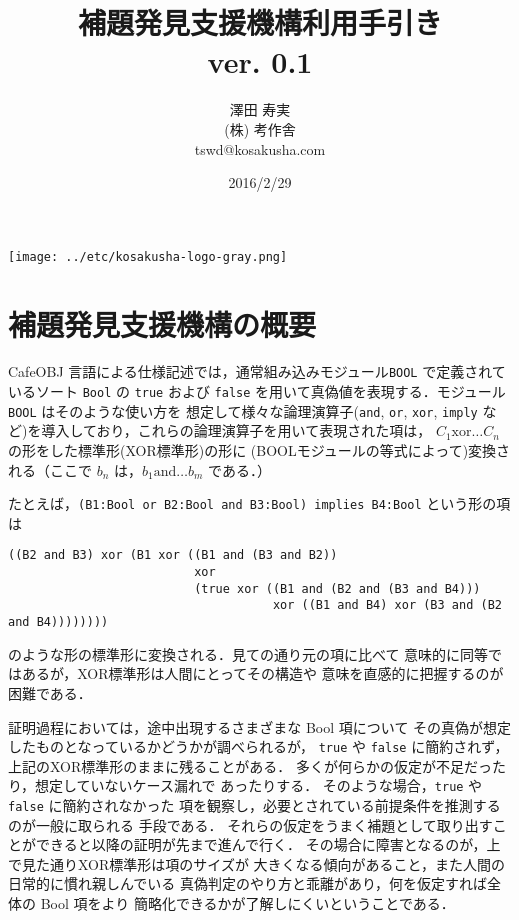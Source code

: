 \documentclass[a4paper,oneside,10pt,here]{memoir}
\begin{document}
\tightlists
\sloppy
\raggedbottom
{}
\frontmatter
\pagestyle{empty}
\title{補題発見支援機構利用手引き \\
ver. 0.1}
\vfill
\author{澤田 寿実\\
  (株) 考作舎\\
  tswd@kosakusha.com}
\date{2016/2/29}
\maketitle
\vfill
\begin{center}
\texttt{[image: ../etc/kosakusha-logo-gray.png]}
\end{center}
\vfill
\thispagestyle{empty}
\newpage
\mainmatter
\pagestyle{plain}
\tableofcontents
\EnableBpAbbreviations
\newpage
\chapter{補題発見支援機構の概要}
CafeOBJ 言語による仕様記述では，通常組み込みモジュール\verb|BOOL|
で定義されているソート \verb|Bool| の \verb|true| および \verb|false|
を用いて真偽値を表現する．モジュール \verb|BOOL| はそのような使い方を
想定して様々な論理演算子(\verb|and|, \verb|or|, \verb|xor|, \verb|imply|
など)を導入しており，これらの論理演算子を用いて表現された項は，
$C_1 \mbox{xor} \ldots C_n$ の形をした標準形(XOR標準形)の形に
(BOOLモジュールの等式によって)変換される（ここで $b_n$ は，$b_1 \mbox{and}\ldots b_m$ である．）

たとえば，\verb|(B1:Bool or B2:Bool and B3:Bool) implies B4:Bool| という形の項は
\begin{verbatim}
((B2 and B3) xor (B1 xor ((B1 and (B3 and B2)) 
                          xor 
                          (true xor ((B1 and (B2 and (B3 and B4))) 
                                     xor ((B1 and B4) xor (B3 and (B2 and B4))))))))
\end{verbatim}
のような形の標準形に変換される．見ての通り元の項に比べて
意味的に同等ではあるが，XOR標準形は人間にとってその構造や
意味を直感的に把握するのが困難である．

証明過程においては，途中出現するさまざまな Bool 項について
その真偽が想定したものとなっているかどうかが調べられるが，
\verb|true| や \verb|false| に簡約されず，
上記のXOR標準形のままに残ることがある．
多くが何らかの仮定が不足だったり，想定していないケース漏れで
あったりする．
そのような場合，\verb|true| や \verb|false| に簡約されなかった
項を観察し，必要とされている前提条件を推測するのが一般に取られる
手段である．
それらの仮定をうまく補題として取り出すことができると以降の証明が先まで進んで行く．
その場合に障害となるのが，上で見た通りXOR標準形は項のサイズが
大きくなる傾向があること，また人間の日常的に慣れ親しんでいる
真偽判定のやり方と乖離があり，何を仮定すれば全体の Bool 項をより
簡略化できるかが了解しにくいということである．
\end{document}
